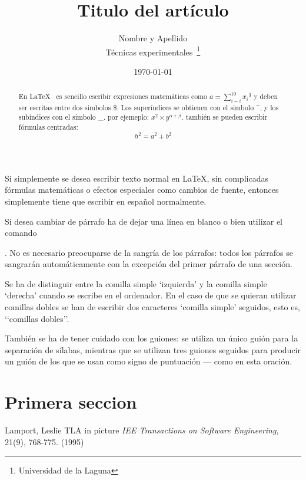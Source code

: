 \documentclass[a4paper,12pt]{article}
\begin{document}
  Si simplemente se desea escribir texto normal en LaTeX,
  sin complicadas f\'ormulas matem\'aticas o efectos especiales
  como cambios de fuente, entonces simplemente tiene que escribir
  en espa\~nol normalmente.
  
  Si desea cambiar de p\'arrafo ha de dejar una l\'inea en blanco o bien
  utilizar el comando \par.
  No es necesario preocuparse de la sangr\'ia de los p\'arrafos:
  todos los p\'arrafos se sangrar\'an autom\'aticamente con la excepci\'on
  del primer p\'arrafo de una secci\'on.
  
  Se ha de distinguir entre la comilla simple ‘izquierda’
  y la comilla simple ‘derecha’ cuando se escribe en el ordenador.
  En el caso de que se quieran utilizar comillas dobles se han de
  escribir dos caracteres ‘comilla simple’ seguidos, esto es,
  ‘‘comillas dobles’’.
  
  Tambi\'en se ha de tener cuidado con los guiones: se utiliza un \'unico
  gui\'on para la separaci\'on de s\'ilabas, mientras que se utilizan
  tres guiones seguidos para producir un gui\'on de los que se usan
  como signo de puntuaci\'on --- como en esta oraci\'on.
  
  \title{Titulo del art\'iculo}
  \author{Nombre y Apellido \\ 
	  T\'ecnicas experimentales~\footnote{Universidad de la Laguna}
	  }
  \date{\today}
  \maketitle
  
  \begin{abstract}
   En \LaTeX{}~\cite{Lam:86} es sencillo escribir expresiones
   matem\'aticas como $a=\sum_{i=i}^{10} {x_i}^{3}$
   y deben ser escritas entre dos simbolos \$.
   Los super\'indices se obtienen con el simbolo \^{}, y
   los sub\'indices con el simbolo \_. 
   por ejemeplo: $x^2 \times y^{\alpha + \beta}$.
   tambi\'en se pueden escribir f\'ormulas centradas:
   \[h^2=a^2 + b^2\] 
  \end{abstract}
  
  \section{Primera seccion}
  
  \begin{thebibliography}{00}
    Lamport, Leslie
    TLA in picture
    \emph{IEE Transactions on Software Engineering},
    21(9), 768-775.
    (1995)
  \end{thebibliography}
\end{document}
